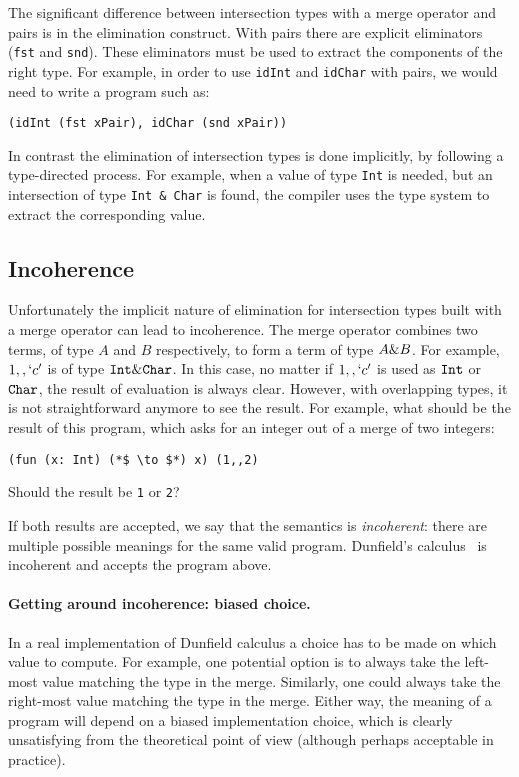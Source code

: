 \noindent The significant difference between intersection types with a
merge operator and pairs is in the elimination construct. With pairs
there are explicit eliminators (\lstinline{fst} and
\lstinline{snd}). These eliminators must be used to extract the
components of the right type. For example, in order to use
\lstinline{idInt} and \lstinline{idChar} with pairs, we would need to
write a program such as:

\begin{lstlisting}
(idInt (fst xPair), idChar (snd xPair))
\end{lstlisting}

\noindent In contrast the elimination of intersection types is done
implicitly, by following a type-directed process. For example,
when a value of type \lstinline{Int} is needed, but an intersection
of type \lstinline{Int & Char} is found, the compiler uses the
type system to extract the corresponding value.

\subsection{Incoherence}\label{subsec:incoherence}
Unfortunately the implicit nature of elimination for intersection
types built with a merge operator can lead to incoherence.
The merge operator combines two terms, of type $A$ and $B$
respectively, to form a term of type $A \& B$. For example,
$1 ,, `c'$ is of type $\texttt{Int} \& \texttt{Char}$. In this case, no
matter if $1 ,, `c'$ is used as $\texttt{Int}$ or $\texttt{Char}$, the result
of evaluation is always clear. However, with overlapping types, it is
not straightforward anymore to see the result. For example, what
should be the result of this program, which asks for an integer out of
a merge of two integers:
\begin{lstlisting}
(fun (x: Int) (*$ \to $*) x) (1,,2)
\end{lstlisting}
Should the result be \lstinline$1$ or \lstinline$2$?

If both results are accepted, we say that the semantics is \emph{incoherent}:
there are multiple possible meanings for the same valid program. Dunfield's
calculus~\cite{dunfield2014elaborating} is incoherent and accepts the program
above.

\paragraph{Getting around incoherence: biased choice.}
In a real implementation of Dunfield calculus a choice has to be made
on which value to compute. For example, one potential option is to
always take the left-most value matching the type in the
merge. Similarly, one could always take the right-most
value matching the type in the merge. Either way, the meaning
of a program will depend on a biased implementation choice,
which is clearly unsatisfying from the theoretical point of view
(although perhaps acceptable in practice).

